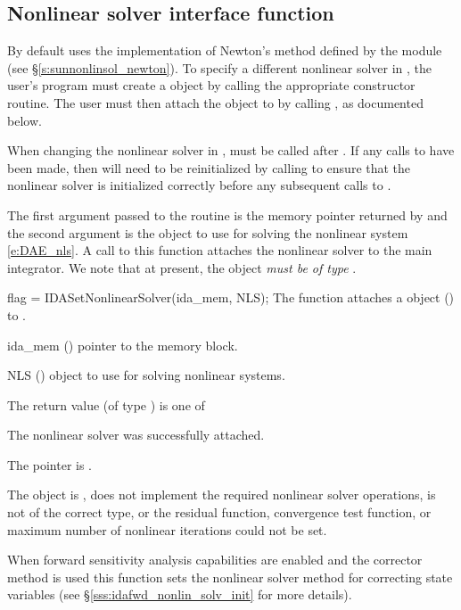 \subsection{Nonlinear solver interface function}
\label{sss:nonlin_solv_init}

By default {\idas} uses the {\sunnonlinsol} implementation of Newton's method
defined by the {\sunnonlinsolnewton} module (see \S\ref{s:sunnonlinsol_newton}).
To specify a different nonlinear solver in {\idas}, the user's program must
create a {\sunnonlinsol} object by calling the appropriate constructor routine.
The user must then attach the {\sunnonlinsol} object to {\idas} by calling
, as documented below.

When changing the nonlinear solver in {\idas},  must
be called after . If any calls to  have been made, then
{\idas} will need to be reinitialized by calling  to ensure
that the nonlinear solver is initialized correctly before any subsequent calls
to .

The first argument passed to the routine  is the
{\idas} memory pointer returned by  and the second argument is
the {\sunnonlinsol} object to use for solving the nonlinear system
\ref{e:DAE_nls}.
A call to this function attaches the nonlinear solver to the main {\idas}
integrator. We note that at present, the {\sunnonlinsol} object
\emph{must be of type} .

{
  flag = IDASetNonlinearSolver(ida\_mem, NLS);
}
{
  The function  attaches a {\sunnonlinsol}
  object () to {\idas}.
}
{
  \begin{args}
  \item[ida\_mem] ()
    pointer to the {\idas} memory block.
  \item[NLS] ()
    {\sunnonlinsol} object to use for solving nonlinear systems.
  \end{args}
}
{
  The return value  (of type ) is one of
  \begin{args}
  \item[\Id{IDA\_SUCCESS}]
    The nonlinear solver was successfully attached.
  \item[\Id{IDA\_MEM\_NULL}]
    The  pointer is .
  \item[\Id{IDA\_ILL\_INPUT}]
    The {\sunnonlinsol} object is , does not implement the required
    nonlinear solver operations, is not of the correct type, or the residual
    function, convergence test function, or maximum number of nonlinear
    iterations could not be set.
  \end{args}
}
{
  When forward sensitivity analysis capabilities are enabled and the
   corrector method is used this
  function sets the nonlinear solver method for correcting state variables (see
  \S\ref{sss:idafwd_nonlin_solv_init} for more details).
}

